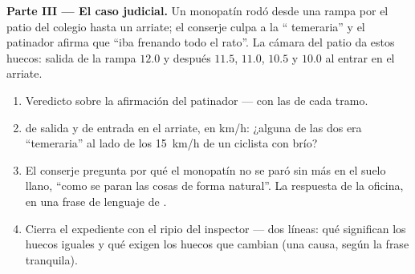 \begin{problem}
\medskip\noindent\textbf{Parte III --- El caso judicial.}
Un monopatín rodó desde una rampa por el patio del colegio hasta un
arriate; el conserje culpa a la `` temeraria'' y el
patinador afirma que ``iba frenando todo el rato''. La cámara del patio
da estos huecos: salida de la rampa $12.0$ y después $11.5$, $11.0$,
$10.5$ y $10.0$ al entrar en el arriate.
\begin{enumerate}[resume]
  \item Veredicto sobre la afirmación del patinador --- con las
         de cada tramo.
  \item {} de salida y  de entrada en el
        arriate, en \unit{km/h}: ¿alguna de las dos era ``temeraria''
        al lado de los \qty{15}{km/h} de un ciclista con brío?
  \item El conserje pregunta por qué el monopatín no se paró sin más
        en el suelo llano, ``como se paran las cosas de forma
        natural''. La respuesta de la oficina, en una frase de
        lenguaje de .
  \item Cierra el expediente con el ripio del inspector --- dos
        líneas: qué significan los huecos iguales y qué exigen los
        huecos que cambian (una causa, según la frase tranquila).
\end{enumerate}
\end{problem}
